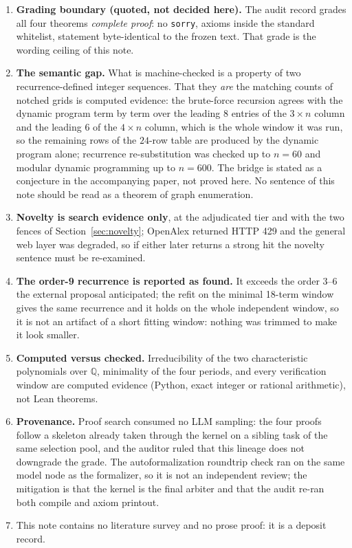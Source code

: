 \documentclass[11pt]{article}
\begin{document}
\begin{enumerate}
\item \textbf{Grading boundary (quoted, not decided here).} The audit record
grades all four theorems \emph{complete proof}: no \texttt{sorry}, axioms inside
the standard whitelist, statement byte-identical to the frozen text. That grade
is the wording ceiling of this note.
\item \textbf{The semantic gap.} What is machine-checked is a property of two
recurrence-defined integer sequences. That they \emph{are} the matching counts of
notched grids is computed evidence: the brute-force recursion agrees with the
dynamic program term by term over the leading $8$ entries of the $3 \times n$
column and the leading $6$ of the $4 \times n$ column, which is the whole window it
was run, so the remaining rows of the $24$-row table are produced by the dynamic
program alone; recurrence re-substitution was checked up to $n = 60$ and modular
dynamic programming up to $n = 600$. The bridge is stated as a conjecture in the
accompanying paper, not proved here. No sentence of this note should be read as a
theorem of graph enumeration.
\item \textbf{Novelty is search evidence only}, at the adjudicated tier and with
the two fences of Section~\ref{sec:novelty}; OpenAlex returned HTTP 429 and the
general web layer was degraded, so if either later returns a strong hit the
novelty sentence must be re-examined.
\item \textbf{The order-9 recurrence is reported as found.} It exceeds the order
$3$--$6$ the external proposal anticipated; the refit on the minimal 18-term
window gives the same recurrence and it holds on the whole independent window, so
it is not an artifact of a short fitting window: nothing was trimmed to make it
look smaller.
\item \textbf{Computed versus checked.} Irreducibility of the two characteristic
polynomials over $\mathbb{Q}$, minimality of the four periods, and every
verification window are computed evidence (Python, exact integer or rational
arithmetic), not Lean theorems.
\item \textbf{Provenance.} Proof search consumed no LLM sampling: the four proofs
follow a skeleton already taken through the kernel on a sibling task of the same
selection pool, and the auditor ruled that this lineage does not downgrade the
grade. The autoformalization roundtrip check ran on the same model node as the
formalizer, so it is not an independent review; the mitigation is that the kernel
is the final arbiter and that the audit re-ran both compile and axiom printout.
\item This note contains no literature survey and no prose proof: it is a deposit
record.
\end{enumerate}
\end{document}
